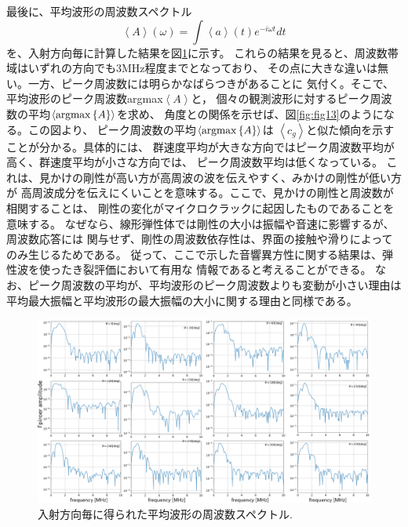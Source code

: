 最後に、平均波形の周波数スペクトル
\begin{equation}
	\left< A \right> (\omega) = \int \left<a\right>(t)e^{-i\omega t}dt
	\label{eqn:ave_A}
\end{equation}
を、入射方向毎に計算した結果を図\ref{fig:fig11_2}に示す。
これらの結果を見ると、周波数帯域はいずれの方向でも3MHz程度までとなっており、
その点に大きな違いは無い。一方、ピーク周波数には明らかなばらつきがあることに
気付く。そこで、平均波形のピーク周波数argmax$\left< A \right>$と，
個々の観測波形に対するピーク周波数の平均$\left< {\rm argmax }\left\{ A \right\}\right>$を求め、
角度との関係を示せば、図\ref{fig:fig13}のようになる。この図より、
ピーク周波数の平均$\left< {\rm argmax }\left\{ A \right\}\right>$は
$\left< c_g\right>$と似た傾向を示すことが分かる。具体的には、
群速度平均が大きな方向ではピーク周波数平均が高く、群速度平均が小さな方向では、
ピーク周波数平均は低くなっている。
これは、見かけの剛性が高い方が高周波の波を伝えやすく、みかけの剛性が低い方が
高周波成分を伝えにくいことを意味する。ここで、見かけの剛性と周波数が相関することは、
剛性の変化がマイクロクラックに起因したものであることを意味する。
なぜなら、線形弾性体では剛性の大小は振幅や音速に影響するが、周波数応答には
関与せず、剛性の周波数依存性は、界面の接触や滑りによってのみ生じるためである。
従って、ここで示した音響異方性に関する結果は、弾性波を使ったき裂評価において有用な
情報であると考えることができる。
なお、ピーク周波数の平均が、平均波形のピーク周波数よりも変動が小さい理由は
平均最大振幅と平均波形の最大振幅の大小に関する理由と同様である。
\begin{figure}[h]
	\begin{center}
	\includegraphics[width=1.0\linewidth]{Figs/fig11_2.eps} 
	\end{center}
	\caption{
		入射方向毎に得られた平均波形の周波数スペクトル.
	} 
	\label{fig:fig11_2}
\end{figure}
